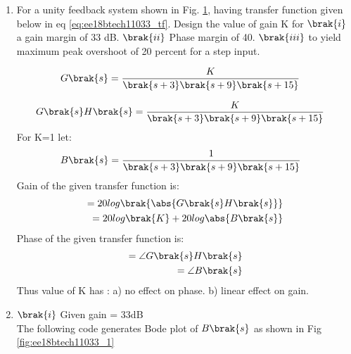 \begin{enumerate}[label=\thesubsection.\arabic*.,ref=\thesubsection.\theenumi]

\item
For a unity feedback system shown in  Fig.  \ref{fig:ee18btech11033_block}, having transfer function given below in eq \ref{eq:ee18btech11033_tf}.  Design the value of gain K for $\brak{i}$ a gain margin of 33 dB. $\brak{ii}$ Phase margin of 40\degree. $\brak{iii}$ to yield maximum peak overshoot of 20 percent for a step input.

\begin{figure}[!ht]
	\begin{center}
		
		\resizebox{\columnwidth}{!}{}
	\end{center}
\caption{}
\label{fig:ee18btech11033_block}
\end{figure}

\begin{align}
\label{eq:ee18btech11033_tf}
G\brak{s} &= \frac{K}{\brak{s+3}\brak{s+9}\brak{s+15}}
\end{align}
\solution 

\begin{align}
\label{eq:ee18btech11033_Tf(s)}
G\brak{s}H\brak{s} &=\frac{K}{\brak{s+3}\brak{s+9}\brak{s+15}}
\end{align}
For K=1 let:
\begin{align}
\label{eq:ee18btech11033_B(s)}
B\brak{s} &= \frac{1}{\brak{s+3}\brak{s+9}\brak{s+15}}
\end{align}
Gain of the given transfer function is:
\begin{align}
\label{eq:ee18btech11033_gain}
      = 20log\brak{\abs{G\brak{s}H\brak{s}}}
    \\= 20log\brak{K} +20log\abs{B\brak{s}}
\end{align}
Phase of the given transfer function is:
\begin{align}
\label{eq:ee18btech11033_phase}
      = \angle{G\brak{s}H\brak{s}}
    \\= \angle{B\brak{s}}
\end{align}
 Thus value of K has : a) no effect on phase. b) linear effect on gain.




\item $\brak{i}$ Given gain = 33dB
\\
\solution The following code generates Bode plot of $B\brak{s}$ as shown in Fig \ref{fig:ee18btech11033_1}


\end{enumerate}
